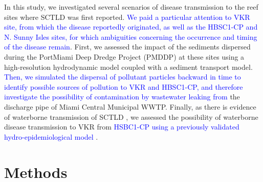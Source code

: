\documentclass[preprint,12pt,authoryear]{elsarticle}
\newcommand{\modif}[1]{\textcolor{blue}{#1}}
\begin{document}
In this study, we investigated several scenarios of disease transmission to the reef sites where SCTLD was first reported. \modif{We paid a particular attention to VKR site, from which the disease reportedly originated, as well as the HBSC1-CP and N. Sunny Isles sites, for which ambiguities concerning the occurrence and timing of the disease remain}. First, we assessed the impact of the sediments dispersed during the PortMiami Deep Dredge Project (PMDDP) at these sites using a high-resolution hydrodynamic model coupled with a sediment transport model. \modif{Then, we simulated the dispersal of pollutant particles backward in time to identify possible sources of pollution to VKR and HBSC1-CP, and therefore investigate the possibility of contamination by wastewater leaking from }the discharge pipe of Miami Central Municipal WWTP. Finally, as there is evidence of waterborne transmission of SCTLD \citep{aeby2019pathogenesis,eaton2021measuring, meiling2021variable}, we assessed the possibility of waterborne disease transmission to VKR from \modif{HSBC1-CP using a previously validated hydro-epidemiological model \citep{dobbelaere2022connecting}}.


\section{Methods}
\end{document}
